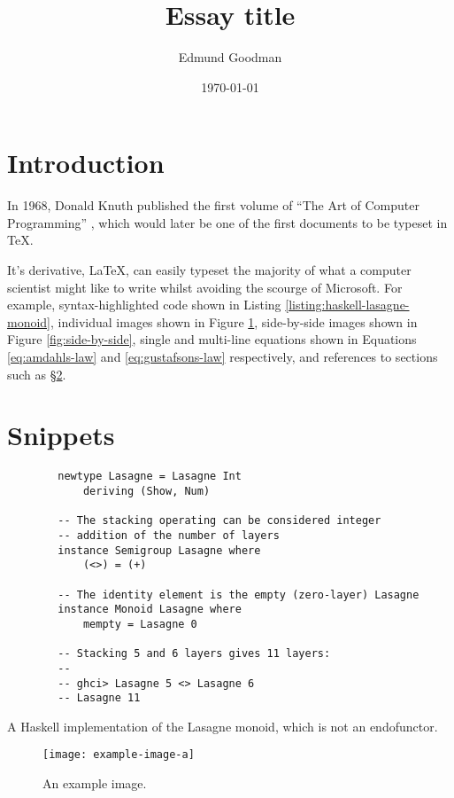 \documentclass[12pt]{article}
\title{Essay title}
\author{Edmund Goodman}
\date{\today}
\begin{document}
\maketitle

\section{Introduction}
\label{sec:introduction}

In 1968, Donald Knuth published the first volume of ``The Art of Computer Programming'' \cite{knuth1997art}, which would later be one of the first documents to be typeset in \TeX.

It's derivative, \LaTeX, can easily typeset the majority of what a computer scientist might like to write whilst avoiding the scourge of Microsoft. For example, syntax-highlighted code shown in Listing \ref{listing:haskell-lasagne-monoid}, individual images shown in Figure \ref{fig:example-image-a}, side-by-side images shown in Figure \ref{fig:side-by-side}, single and multi-line equations shown in Equations \ref{eq:amdahls-law} and \ref{eq:gustafsons-law} respectively, and references to sections such as §\ref{sec:snippets}.

\section{Snippets}
\label{sec:snippets}

\begin{listing}[H]
    \begin{verbatim}
        newtype Lasagne = Lasagne Int
            deriving (Show, Num)

        -- The stacking operating can be considered integer
        -- addition of the number of layers
        instance Semigroup Lasagne where
            (<>) = (+)

        -- The identity element is the empty (zero-layer) Lasagne
        instance Monoid Lasagne where
            mempty = Lasagne 0

        -- Stacking 5 and 6 layers gives 11 layers:
        --
        -- ghci> Lasagne 5 <> Lasagne 6
        -- Lasagne 11
    \end{verbatim}
    \caption{A Haskell implementation of the Lasagne monoid, which is not an endofunctor.}
    \label{listing:haskell-lasagne-monoid}
\end{listing}

\begin{figure}[H]
    \centering
    \texttt{[image: example-image-a]}
    \caption{An example image.}
    \label{fig:example-image-a}
\end{figure}
\end{document}
